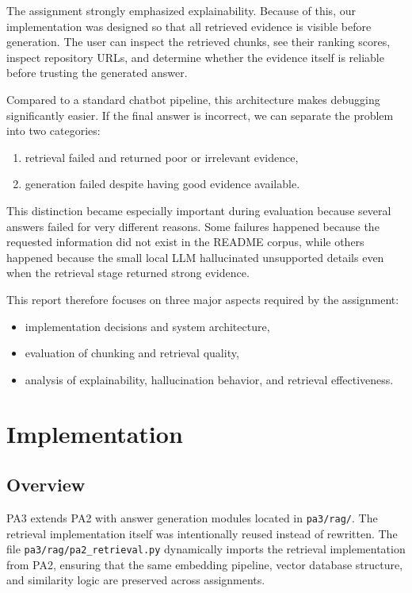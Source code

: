 \documentclass[11pt,a4paper]{article}
\begin{document}
The assignment strongly emphasized explainability. Because of this, our implementation was designed so that all retrieved evidence is visible before generation. The user can inspect the retrieved chunks, see their ranking scores, inspect repository URLs, and determine whether the evidence itself is reliable before trusting the generated answer.

Compared to a standard chatbot pipeline, this architecture makes debugging significantly easier. If the final answer is incorrect, we can separate the problem into two categories:

\begin{enumerate}
  \item retrieval failed and returned poor or irrelevant evidence,
  \item generation failed despite having good evidence available.
\end{enumerate}

This distinction became especially important during evaluation because several answers failed for very different reasons. Some failures happened because the requested information did not exist in the README corpus, while others happened because the small local LLM hallucinated unsupported details even when the retrieval stage returned strong evidence.

This report therefore focuses on three major aspects required by the assignment:

\begin{itemize}
  \item implementation decisions and system architecture,
  \item evaluation of chunking and retrieval quality,
  \item analysis of explainability, hallucination behavior, and retrieval effectiveness.
\end{itemize}

\section{Implementation}

\subsection{Overview}
PA3 extends PA2 with answer generation modules located in \texttt{pa3/rag/}. The retrieval implementation itself was intentionally reused instead of rewritten. The file \texttt{pa3/rag/pa2\_retrieval.py} dynamically imports the retrieval implementation from PA2, ensuring that the same embedding pipeline, vector database structure, and similarity logic are preserved across assignments.
\end{document}
